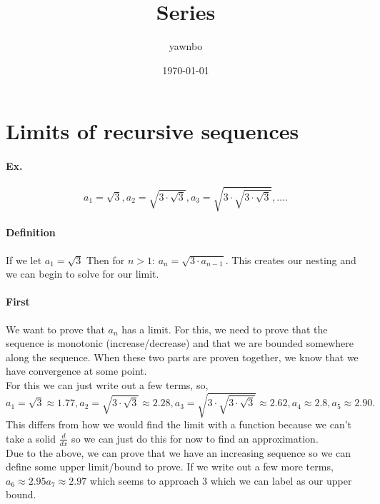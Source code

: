 \documentclass[a4paper]{article}
\title{Series}
\author{yawnbo}
\date{\today}
\begin{document}
\maketitle
\section{Limits of recursive sequences}%
\label{sec:Limits of recursive sequences}

\paragraph{Ex.}%
\label{par:Ex.}

\[
a_1 = \sqrt{ 3}, a_2 = \sqrt{ 3 \cdot \sqrt{ 3}}, a_3 = \sqrt{ 3 \cdot \sqrt{ 3 \cdot \sqrt{ 3}}}, \ldots
.\] 

\paragraph{Definition\\}

If we let $ a_1 = \sqrt{ 3} $ Then for $ n>1 $: $ a_n = \sqrt{ 3\cdot a_{ n-1 }} $.
This creates our nesting and we can begin to solve for our limit. 

\paragraph{First \\}
We want to prove that $ a_n $ has a limit. For this, we need to prove that the sequence is monotonic (increase/decrease) and that we are bounded somewhere along the sequence. When these two parts are proven together, we know that we have convergence at some point. \\

For this we can just write out a few terms, so,
\[
a_1 = \sqrt{ 3} \approx 1.77, a_2 = \sqrt{ 3\cdot \sqrt{ 3}} \approx 2.28, a_3 = \sqrt{ 3\cdot \sqrt{ 3\cdot \sqrt{ 3}}} \approx 2.62, a_{ 4 } \approx 2.8 , a_{ 5 } \approx 2.90
.\] 
This differs from how we would find the limit with a function because we can't take a solid $ \frac{ d }{ dx }  $ so we can just do this for now to find an approximation.\\

Due to the above, we can prove that we have an increasing sequence so we can define some upper limit/bound to prove. If we write out a few more terms, $ a_6 \approx 2.95 a_7 \approx 2.97 $ which seems to approach 3 which we can label as our upper bound. \\
\end{document}
